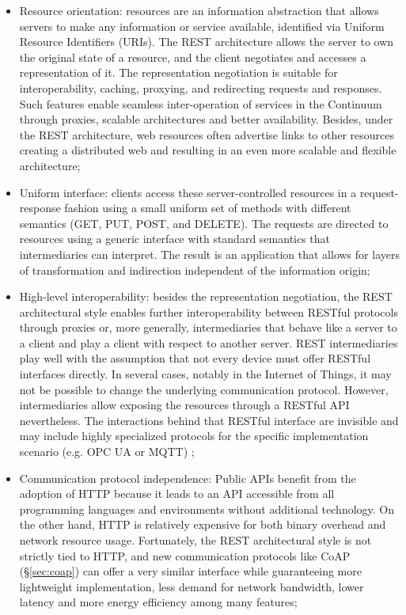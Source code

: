 \begin{itemize}
    \item Resource orientation: resources are an information abstraction that allows servers to make any information or service available, identified via Uniform Resource Identifiers (URIs). The REST architecture allows the server to own the original state of a resource, and the client negotiates and accesses a representation of it. The representation negotiation is suitable for interoperability, caching, proxying, and redirecting requests and responses. Such features enable seamless inter-operation of services in the Continuum through proxies, scalable architectures and better availability. Besides, under the REST architecture, web resources often advertise links to other resources creating a distributed web and resulting in an even more scalable and flexible architecture;
    \item Uniform interface: clients access these server-controlled resources in a request-response fashion using a small uniform set of methods with different semantics (GET, PUT, POST, and DELETE). The requests are directed to resources using a generic interface with standard semantics that intermediaries can interpret. The result is an application that allows for layers of transformation and indirection independent of the information origin;
    \item High-level interoperability: besides the representation negotiation, the REST architectural style enables further interoperability between RESTful protocols through proxies or, more generally, intermediaries that behave like a server to a client and play a client with respect to another server. REST intermediaries play well with the assumption that not every device must offer RESTful interfaces directly. In several cases, notably in the Internet of Things, it may not be possible to change the underlying communication protocol. However, intermediaries allow exposing the resources through a RESTful API nevertheless. The interactions behind that RESTful interface are invisible and may include highly specialized protocols for the specific implementation scenario (e.g. OPC UA or MQTT) \cite{guinard2010resource};
    \item Communication protocol independence: Public APIs benefit from the adoption of HTTP because it leads to an API accessible from all programming languages and environments without additional technology. On the other hand, HTTP is relatively expensive for both binary overhead and network resource usage. Fortunately, the REST architectural style is not strictly tied to HTTP, and new communication protocols like CoAP (§\ref{sec:coap}) can offer a very similar interface while guaranteeing more lightweight implementation, less demand for network bandwidth, lower latency and more energy efficiency among many features;

\end{itemize}
